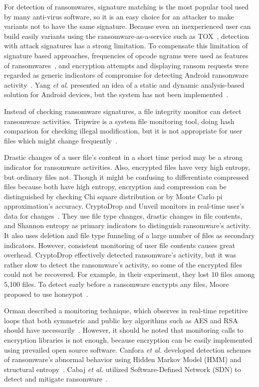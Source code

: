 \documentclass[conference]{IEEEtran}
\newcommand{\etal}{{\it et al.}\xspace}
\begin{document}
For detection of ransomwares, signature matching is the most
popular tool used by many anti-virus software, so it is an easy
choice for an attacker to make variants not to have the same
signature.  Because even an inexperienced user can build easily
variants using the ransomware-as-a-service such as
TOX~\cite{walter15}, detection with attack signatures has a strong
limitation.  To compensate this limitation of signature based
approaches, frequencies of opcode ngrams were used as features of
ransomwares~\cite{canfora15}, and encryption attempts and
displaying ransom requests were regarded as generic indicators of
compromise for detecting Android ransomware
activity~\cite{andronio15}.  Yang \etal presented an idea of a
static and dynamic analysis-based solution for Android devices, but
the system has not been implemented~\cite{yang15}.

Instead of checking ransomware signatures, a file integrity monitor
can detect ransomware activities. Tripwire is a system file
monitoring tool, doing hash comparison for checking illegal
modification, but it is not appropriate for user files which might
change frequently~\cite{kim94}.

Drastic changes of a user file's content in a short time period may
be a strong indicator for ransomware activities. Also, encrypted
files have very high entropy, but ordinary files not.  Though it
might be confusing to differentiate compressed files because both
have high entropy, encryption and compression can be distinguished
by checking Chi square distribution or by Monte Carlo pi
approximation's accuracy.  CryptoDrop and Unveil monitors in
real-time user's data for changes~\cite{scaife16,kharaz}.  They use
file type changes, drastic changes in file contents, and Shannon
entropy as primary indicators to distinguish ransomware's activity.
It also uses deletion and file type funneling of a large number of
files as secondary indicators.  However, consistent monitoring of
user file contents causes great overhead.  CryptoDrop effectively
detected ransomware's activity, but it was rather slow to detect
the ransomware's activity, so some of the encrypted files could not
be recovered. For example, in their experiment, they lost 10 files
among 5,100 files.  To detect early before a ransomware encrypts
any files, Moore proposed to use honeypot~\cite{moore16}.

Orman described a monitoring technique, which observes in real-time
repetitive loops that both symmetric and public key algorithms such
as AES and RSA should have necessarily~\cite{orman16}.  However, it
should be noted that monitoring calls to encryption libraries is
not enough, because encryption can be easily implemented using
prevailed open source software.  Canfora \etal developed detection
schemes of ransomware's abnormal behavior using Hidden Markov Model
(HMM) and structural entropy~\cite{canfora16}.  Cabaj \etal
utilized Software-Defined Network (SDN) to detect and mitigate
ransomware~\cite{cabaj16}.
\end{document}
